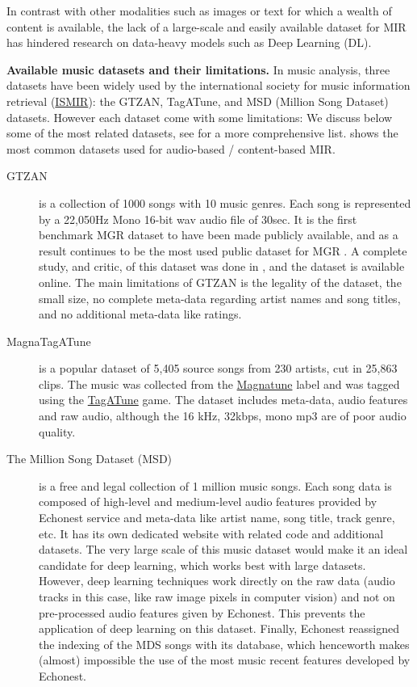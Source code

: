\documentclass{article}
\begin{document}
In contrast with other modalities such as images or text for which a wealth of content is available, the lack of a large-scale and easily available dataset for MIR has hindered research on data-heavy models such as Deep Learning (DL).

\noindent
{\bf Available music datasets and their limitations.} In music analysis, three datasets have been widely used by the international society for music information retrieval (\href{http://www.ismir.net/}{ISMIR}): the GTZAN, TagATune, and MSD (Million Song Dataset) datasets. However each dataset come with some limitations:
We discuss below some of the most related datasets, see  for a more comprehensive list.
 shows the most common datasets used for audio-based / content-based MIR.
\begin{description}
	\item[GTZAN] \cite{gtzan} is a collection of 1000 songs with 10 music genres. Each song is represented by a 22,050Hz Mono 16-bit wav audio file of 30sec. It is the first benchmark MGR dataset to have been made publicly available, and as a result continues to be the most used public dataset for MGR \cite{mgr_eval}. A complete study, and critic, of this dataset was done in \cite{gtzan_critic_1}, and the dataset is available online. The main limitations of GTZAN is the legality of the dataset, the small size, no complete meta-data regarding artist names and song titles, and no additional meta-data like ratings.
	\item[MagnaTagATune] \cite{magnatagatune} is a popular dataset of 5,405 source songs from 230 artists, cut in 25,863 clips. The music was collected from the \href{https://magnatune.com/}{Magnatune} label and was tagged using the \href{http://tagatune.org/}{TagATune} game. The dataset includes meta-data, audio features and raw audio, although the 16 kHz, 32kbps, mono mp3 are of poor audio quality.
	\item[The Million Song Dataset (MSD)] \cite{msd} is a free and legal collection of 1 million music songs. Each song data is composed of high-level and medium-level audio features provided by  Echonest service and meta-data like artist name, song title, track genre, etc. It has its own dedicated website with related code and additional datasets. The very large scale of this music dataset would make it an ideal candidate for deep learning, which works best with large datasets. However, deep learning techniques work directly on the raw data (audio tracks in this case, like raw image pixels in computer vision) and not on pre-processed audio features given by Echonest. This prevents the application of deep learning on this dataset. Finally, Echonest reassigned the indexing of the MDS songs with its database, which henceworth makes (almost) impossible the use of the most music recent features developed by Echonest.

\end{description}
\end{document}
